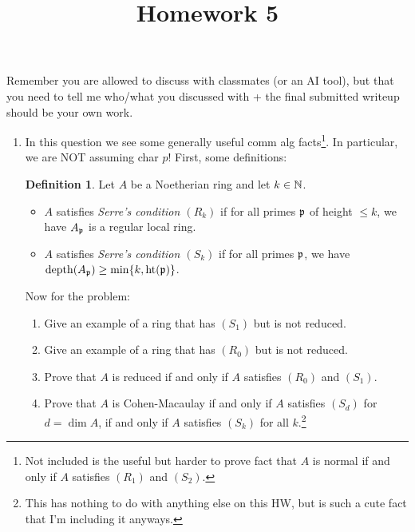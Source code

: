 \documentclass[11pt]{amsart}
\title{Homework 5}
\date{\vspace{-4em}}
\theoremstyle{definition}
\newtheorem{defn}{Definition}
\begin{document}
\maketitle\thispagestyle{fancy}

Remember you are allowed to discuss with classmates (or an AI tool), but that you need to tell me who/what you discussed with + the final submitted writeup should be your own work.


\begin{enumerate}[itemsep=4em]

\item In this question we see some generally useful comm alg facts\footnote{Not included is the useful but harder to prove fact that $A$ is normal if and only if $A$ satisfies $(R_1)$ and $(S_2)$.}. 
In particular, we are NOT assuming char $p$! First, some definitions:
\begin{defn}
Let $A$ be a Noetherian ring and let $k\in \mathbb{N}$.
\begin{itemize}
\item $A$ satisfies \emph{Serre's condition $(R_k)$} if for all primes $\mathfrak{p}$ of height $\le k$, we have $A_{\mathfrak{p}}$ is a regular local ring.

\item $A$ satisfies \emph{Serre's condition $(S_k)$} if for all primes $\mathfrak{p}$, we have $\operatorname{depth}(A_{\mathfrak{p}})\ge \min\{k,\operatorname{ht}(\mathfrak{p})\}$.
\end{itemize}
\end{defn}
Now for the problem:
\begin{enumerate}

\item Give an example of a ring that has $(S_1)$ but is not reduced.

\item Give an example of a ring that has $(R_0)$ but is not reduced.



\item Prove that $A$ is reduced if and only if $A$ satisfies $(R_0)$ and $(S_1)$.



\item Prove that $A$ is Cohen-Macaulay if and only if $A$ satisfies $(S_d)$ for $d=\dim A$, if and only if  $A$ satisfies $(S_k)$ for all $k$.\footnote{This has nothing to do with anything else on this HW, but is such a cute fact that I'm including it anyways.}


\end{enumerate}


\end{enumerate}
\end{document}

